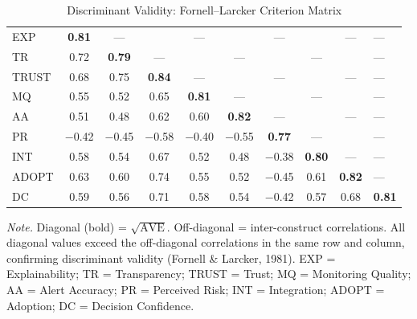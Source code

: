 \begin{table}[!htbp]
\tablestripes
\caption{Discriminant Validity: Fornell--Larcker Criterion Matrix}
\tablefontsize
\begin{tabularx}{\textwidth}{@{} >{\raggedright\arraybackslash}p{1.4cm} C C C C C C C C L @{}}
\toprule
 &  &  &  &  &  &  &  &  &  \\
\midrule
EXP   & \textbf{0.81} & --- &      & --- &      & --- &      & --- & --- \\
TR    & 0.72 & \textbf{0.79} & --- &      & --- &      & --- &      & --- \\
TRUST & 0.68 & 0.75 & \textbf{0.84} & --- &      & --- &      & --- & --- \\
MQ    & 0.55 & 0.52 & 0.65 & \textbf{0.81} & --- &      & --- &      & --- \\
AA    & 0.51 & 0.48 & 0.62 & 0.60 & \textbf{0.82} & --- &      & --- & --- \\
PR    & $-$0.42 & $-$0.45 & $-$0.58 & $-$0.40 & $-$0.55 & \textbf{0.77} & --- &      & --- \\
INT   & 0.58 & 0.54 & 0.67 & 0.52 & 0.48 & $-$0.38 & \textbf{0.80} & --- & --- \\
ADOPT & 0.63 & 0.60 & 0.74 & 0.55 & 0.52 & $-$0.45 & 0.61 & \textbf{0.82} & --- \\
DC    & 0.59 & 0.56 & 0.71 & 0.58 & 0.54 & $-$0.42 & 0.57 & 0.68 & \textbf{0.81} \\
\bottomrule
\end{tabularx}
\vspace{0.5em}\noindent\textit{Note.} Diagonal (bold) = $\sqrt{\text{AVE}}$. Off-diagonal = inter-construct correlations. All diagonal values exceed the off-diagonal correlations in the same row and column, confirming discriminant validity (Fornell \& Larcker, 1981). EXP = Explainability; TR = Transparency; TRUST = Trust; MQ = Monitoring Quality; AA = Alert Accuracy; PR = Perceived Risk; INT = Integration; ADOPT = Adoption; DC = Decision Confidence.
\end{table}



